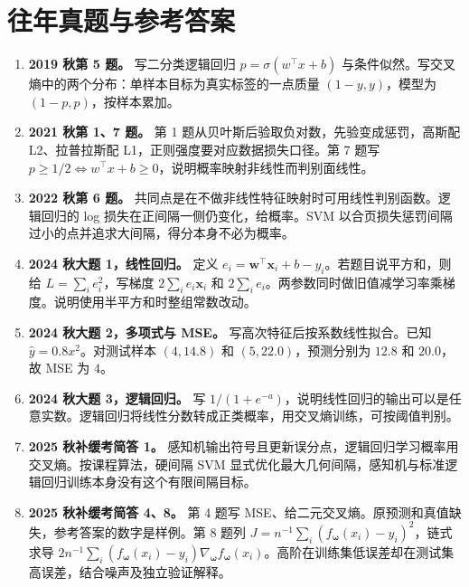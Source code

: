 \documentclass[UTF8,a4paper,zihao=-4,fontset=fandol]{ctexrep}
\begin{document}
\section{往年真题与参考答案}
\begin{enumerate}[leftmargin=2em]
\item \textbf{2019 秋第 5 题。} 写二分类逻辑回归 \(p=\sigma(w^\top x+b)\) 与条件似然。写交叉熵中的两个分布：单样本目标为真实标签的一点质量 \((1-y,y)\)，模型为 \((1-p,p)\)，按样本累加。
\item \textbf{2021 秋第 1、7 题。} 第 1 题从贝叶斯后验取负对数，先验变成惩罚，高斯配 L2、拉普拉斯配 L1，正则强度要对应数据损失口径。第 7 题写 \(p\ge1/2\Leftrightarrow w^\top x+b\ge0\)，说明概率映射非线性而判别面线性。
\item \textbf{2022 秋第 6 题。} 共同点是在不做非线性特征映射时可用线性判别函数。逻辑回归的 log 损失在正间隔一侧仍变化，给概率。SVM 以合页损失惩罚间隔过小的点并追求大间隔，得分本身不必为概率。
\item \textbf{2024 秋大题 1，线性回归。} 定义 \(e_i=\bm w^\top\bm x_i+b-y_i\)。若题目说平方和，则给 \(L=\sum_i e_i^2\)，写梯度 \(2\sum_i e_i\bm x_i\) 和 \(2\sum_i e_i\)。两参数同时做旧值减学习率乘梯度。说明使用半平方和时整组常数改动。
\item \textbf{2024 秋大题 2，多项式与 MSE。} 写高次特征后按系数线性拟合。已知 \(\hat y=0.8x^2\)。对测试样本 \((4,14.8)\) 和 \((5,22.0)\)，预测分别为 \(12.8\) 和 \(20.0\)，故 MSE 为 \(4\)。
\item \textbf{2024 秋大题 3，逻辑回归。} 写 \(1/(1+e^{-a})\)，说明线性回归的输出可以是任意实数。逻辑回归将线性分数转成正类概率，用交叉熵训练，可按阈值判别。
\item \textbf{2025 秋补缓考简答 1。} 感知机输出符号且更新误分点，逻辑回归学习概率用交叉熵。按课程算法，硬间隔 SVM 显式优化最大几何间隔，感知机与标准逻辑回归训练本身没有这个有限间隔目标。
\item \textbf{2025 秋补缓考简答 4、8。} 第 4 题写 MSE、给二元交叉熵。原预测和真值缺失，参考答案的数字是样例。第 8 题列 \(J=n^{-1}\sum_i(f_{\bm\omega}(x_i)-y_i)^2\)，链式求导 \(2n^{-1}\sum_i(f_{\bm\omega}(x_i)-y_i)\nabla_{\bm\omega}f_{\bm\omega}(x_i)\)。高阶在训练集低误差却在测试集高误差，结合噪声及独立验证解释。
\end{enumerate}
\end{document}
